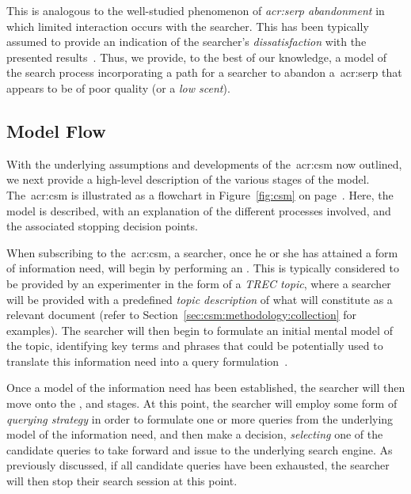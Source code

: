 This is analogous to the well-studied phenomenon of \emph{\gls{acr:serp} abandonment} in which limited interaction occurs with the searcher. This has been typically assumed to provide an indication of the searcher's \emph{dissatisfaction} with the presented results~\citep{dassarma2008serp_abandonment, chuklin2012serp_abandonment}. Thus, we provide, to the best of our knowledge, a model of the search process incorporating a path for a searcher to abandon a~\gls{acr:serp} that appears to be of poor quality (or a \emph{low scent}).

\subsection{Model Flow}\label{sec:csm:csm:flow}
With the underlying assumptions and developments of the~\gls{acr:csm} now outlined, we next provide a high-level description of the various stages of the model. The~\gls{acr:csm} is illustrated as a flowchart in Figure~\ref{fig:csm} on page~\pageref{fig:csm}. Here, the model is described, with an explanation of the different processes involved, and the associated stopping decision points.

When subscribing to the~\gls{acr:csm}, a searcher, once he or she has attained a form of information need, will begin by performing an . This is typically considered to be provided by an experimenter in the form of a \emph{TREC topic}, where a searcher will be provided with a predefined \emph{topic description} of what will constitute as a relevant document (refer to Section~\ref{sec:csm:methodology:collection} for examples). The searcher will then begin to formulate an initial mental model of the topic, identifying key terms and phrases that could be potentially used to translate this information need into a query formulation~\citep{borlund2003iir_model}.

Once a model of the information need has been established, the searcher will then move onto the ,  and  stages. At this point, the searcher will employ some form of \emph{querying strategy} in order to formulate one or more queries from the underlying model of the information need, and then make a decision, \emph{selecting} one of the candidate queries to take forward and issue to the underlying search engine. As previously discussed, if all candidate queries have been exhausted, the searcher will then stop their search session at this point.

